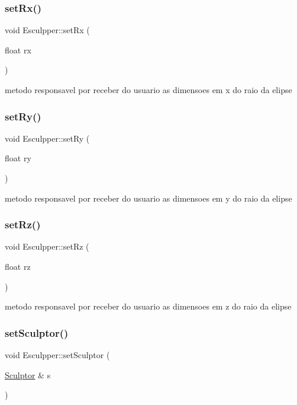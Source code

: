 \subsubsection{\texorpdfstring{setRx()}{setRx()}}
{\footnotesize\ttfamily void Esculpper\+::set\+Rx (\begin{DoxyParamCaption}\item[{float}]{rx }\end{DoxyParamCaption})}

metodo responsavel por receber do usuario as dimensoes em x do raio da elipse \mbox{\label{class_esculpper_a1b2e3090d8ff1affd19d2b3935c645d2}} 
\subsubsection{\texorpdfstring{setRy()}{setRy()}}
{\footnotesize\ttfamily void Esculpper\+::set\+Ry (\begin{DoxyParamCaption}\item[{float}]{ry }\end{DoxyParamCaption})}

metodo responsavel por receber do usuario as dimensoes em y do raio da elipse \mbox{\label{class_esculpper_a19c5064c0d1f5b22b3650fba22b9ed3a}} 
\subsubsection{\texorpdfstring{setRz()}{setRz()}}
{\footnotesize\ttfamily void Esculpper\+::set\+Rz (\begin{DoxyParamCaption}\item[{float}]{rz }\end{DoxyParamCaption})}

metodo responsavel por receber do usuario as dimensoes em z do raio da elipse \mbox{\label{class_esculpper_a60d29da81456257d8956aa8a49cb65a7}} 
\subsubsection{\texorpdfstring{setSculptor()}{setSculptor()}}
{\footnotesize\ttfamily void Esculpper\+::set\+Sculptor (\begin{DoxyParamCaption}\item[{\mbox{\hyperlink{class_sculptor}{Sculptor}} \&}]{s }\end{DoxyParamCaption})}

